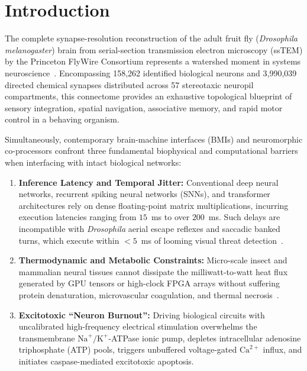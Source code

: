 \documentclass[10pt,twocolumn]{article}
\begin{document}
\section{Introduction}
The complete synapse-resolution reconstruction of the adult fruit fly (\textit{Drosophila melanogaster}) brain from serial-section transmission electron microscopy (ssTEM) by the Princeton FlyWire Consortium represents a watershed moment in systems neuroscience~\cite{dorkenwald2024neuronal, schlegel2024whole}. Encompassing 158,262 identified biological neurons and 3,990,039 directed chemical synapses distributed across 57 stereotaxic neuropil compartments, this connectome provides an exhaustive topological blueprint of sensory integration, spatial navigation, associative memory, and rapid motor control in a behaving organism.

Simultaneously, contemporary brain-machine interfaces (BMIs) and neuromorphic co-processors confront three fundamental biophysical and computational barriers when interfacing with intact biological networks:
\begin{enumerate}
    \item \textbf{Inference Latency and Temporal Jitter:} Conventional deep neural networks, recurrent spiking neural networks (SNNs), and transformer architectures rely on dense floating-point matrix multiplications, incurring execution latencies ranging from $15$~ms to over $200$~ms. Such delays are incompatible with \textit{Drosophila} aerial escape reflexes and saccadic banked turns, which execute within $<5$~ms of looming visual threat detection~\cite{muijres2014flies}.
    \item \textbf{Thermodynamic and Metabolic Constraints:} Micro-scale insect and mammalian neural tissues cannot dissipate the milliwatt-to-watt heat flux generated by GPU tensors or high-clock FPGA arrays without suffering protein denaturation, microvascular coagulation, and thermal necrosis~\cite{laughlin1998metabolic, niven2008energy}.
    \item \textbf{Excitotoxic ``Neuron Burnout'':} Driving biological circuits with uncalibrated high-frequency electrical stimulation overwhelms the transmembrane $\text{Na}^+/\text{K}^+$-ATPase ionic pump, depletes intracellular adenosine triphosphate (ATP) pools, triggers unbuffered voltage-gated $\text{Ca}^{2+}$ influx, and initiates caspase-mediated excitotoxic apoptosis.
\end{enumerate}
\end{document}
